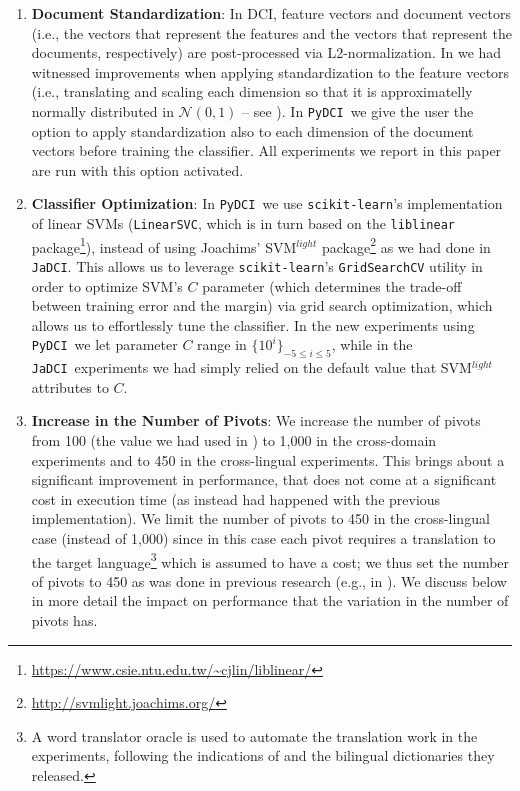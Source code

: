 \documentclass{article}
\newcommand{\jadci}{\texttt{JaDCI}}
\newcommand{\pydci}{\texttt{PyDCI}}
\begin{document}
\begin{enumerate}

\item \label{item:standardization} \textbf{Document Standardization}:
  In DCI, feature vectors and document vectors (i.e., the vectors that
  represent the features and the vectors that represent the documents,
  respectively) are post-processed via L2-normalization. In
  \citep{Moreo:2016fg} we had witnessed improvements when applying
  standardization to the feature vectors (i.e., translating and
  scaling each dimension so that it is approximatelly normally
  distributed in $\mathcal{N}(0,1)$ -- see \citep[p.\
  144]{Moreo:2016fg}). In \pydci\ we give the user the option to apply
  standardization also to each dimension of the document vectors
  before training the classifier.
All experiments we report in this paper are run with this option
  activated.

\item \label{item:optimization} \textbf{Classifier Optimization}: In
  \pydci\ we use \texttt{scikit-learn}'s implementation of linear SVMs
  (\texttt{LinearSVC}, which is in turn based on the
  \texttt{liblinear}
  package\footnote{\url{https://www.csie.ntu.edu.tw/~cjlin/liblinear/}}),
  instead of using Joachims' SVM$^{light}$
  package\footnote{\url{http://svmlight.joachims.org/}} as we had done
  in \jadci.  This allows us to leverage \texttt{scikit-learn}'s
  \texttt{GridSearchCV} utility in order to optimize SVM's $C$
  parameter (which determines the trade-off between training error and
  the margin) via grid search optimization, which allows us to
  effortlessly tune the classifier. In the new experiments using
  \pydci\ we let parameter $C$ range in $\{10^i\}_{-5\leq i\leq 5}$,
  while in the \jadci\ experiments we had simply relied on the default
  value that SVM$^{light}$ attributes to $C$.


\item \label{item:pivots} \textbf{Increase in the Number of Pivots}:
  We increase the number of pivots from 100 (the value we had used in
  \citep{Moreo:2016fg}) to 1,000 in the cross-domain experiments and
  to 450 in the cross-lingual experiments. This brings about a
  significant improvement in performance, that does not come at a
  significant cost in execution time (as instead had happened with the
  previous implementation).  We limit the number of pivots to 450 in
  the cross-lingual case (instead of 1,000) since in this case each
  pivot requires a translation to the target language\footnote{A word
  translator oracle is used to automate the translation work in the
  experiments, following the indications of
  \citep{Prettenhofer:2010ys} and the bilingual dictionaries they
  released.} which is assumed to have a cost; we thus set the number
  of pivots to 450 as was done in previous research (e.g., in
  \citep{Prettenhofer:2010ys}). We discuss below in more detail the
  impact on performance that the variation in the number of pivots
  has.

\end{enumerate}
\end{document}
